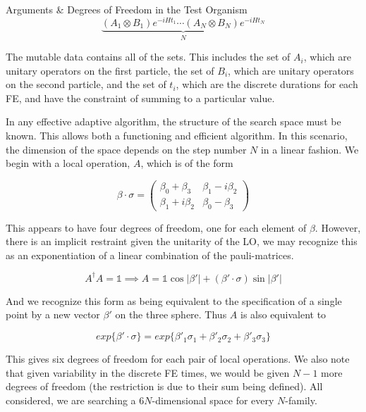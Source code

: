 \documentclass[14pt]{beamer}
\begin{document}
\begin{frame}
\begin{columns}
\begin{column}{.45\textwidth}
\begin{block}{Arguments \& Degrees of Freedom in the Test Organism}
	\begin{equation}
		\underbrace{  (A_1\otimes B_1)e^{-i H t_1}\cdots(A_{N}\otimes B_{N})e^{-i H t_{N}}}_{N}
	\end{equation}

	The mutable data contains all of the sets. This includes the set of $A_i$, which are unitary operators on the first particle, the set of $B_i$, which are unitary operators on the second particle, and the set of $t_i$, which are the discrete durations for each FE, and have the constraint of summing to a particular value.
	
	In any effective adaptive algorithm, the structure of the search space must be known. This allows both a functioning and efficient algorithm. In this scenario, the dimension of the space depends on the step number $N$ in a linear fashion. We begin with a local operation, $A$, which is of the form

	\begin{equation}
		\beta \cdot \sigma 
		= 
		\begin{pmatrix}
			\beta_0 + \beta_3    &    \beta_1 - i \beta_2\\[3mm]
			\beta_1 + i \beta_2  &    \beta_0 - \beta_3
		\end{pmatrix}
	\end{equation}

	This appears to have four degrees of freedom, one for each element of $\beta$. However, there is an implicit restraint given the unitarity of the LO, we may recognize this as an exponentiation of a linear combination of the pauli-matrices. 

	\begin{equation}
		A^{\dagger}A = \mathds{1} \implies A = \mathds{1}\cos{|\beta'|} + (\beta' \cdot \sigma) \sin{|\beta'|}
	\end{equation}

	And we recognize this form as being equivalent to the specification of a single point by a new vector $\beta'$ on the three sphere. Thus $A$ is also equivalent to 

	\begin{equation}
		exp\{\beta' \cdot \sigma\} = exp\{\beta'_1 \sigma_1 + \beta'_2 \sigma_2 + \beta'_3 \sigma_3 \}
	\end{equation}

	This gives six degrees of freedom for each pair of local operations. We also note that given variability in the discrete FE times, we would be given $N-1$ more degrees of freedom (the restriction is due to their sum being defined). All considered,  we are searching a $6N$-dimensional space for every $N$-family.




\end{block}
\end{column}
\end{columns}
\end{frame}
\end{document}
